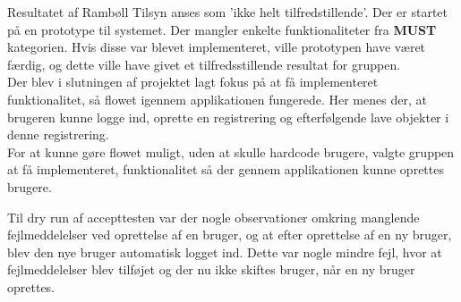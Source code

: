 \clearpage

Resultatet af Rambøll Tilsyn anses som 'ikke helt tilfredstillende'. 
Der er startet på en prototype til systemet. Der mangler enkelte funktionaliteter fra \textbf{MUST} kategorien. Hvis disse var blevet implementeret, ville prototypen have været færdig, og dette ville have givet et tilfredsstillende resultat for gruppen. \\
Der blev i slutningen af projektet lagt fokus på at få implementeret funktionalitet, så flowet igennem applikationen fungerede. Her menes der, at brugeren kunne logge ind, oprette en registrering og efterfølgende lave objekter i denne registrering. \\
For at kunne gøre flowet muligt, uden at skulle hardcode brugere, valgte gruppen at få implementeret, funktionalitet så der gennem applikationen kunne oprettes brugere. 

Til dry run af accepttesten var der nogle observationer omkring manglende fejlmeddelelser ved oprettelse af en bruger, og at efter oprettelse af en ny bruger, blev den nye bruger automatisk logget ind. Dette var nogle mindre fejl, hvor at fejlmeddelelser blev tilføjet og der nu ikke skiftes bruger, når en ny bruger oprettes.